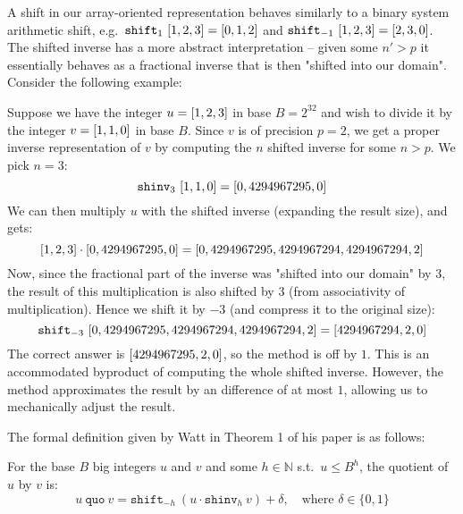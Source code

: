 A shift in our array-oriented representation behaves similarly to a binary
system arithmetic shift, e.g.\ $\mathtt{shift}_1~\mathtt{[}1,2,3\mathtt{]} = \mathtt{[}0,1,2\mathtt{]}$ and
$\mathtt{shift}_{-1}~\mathtt{[}1,2,3\mathtt{]} = \mathtt{[}2,3,0\mathtt{]}$. The shifted inverse has a more
abstract interpretation -- given some $n'>p$ it essentially behaves as a
fractional inverse that is then "shifted into our domain". Consider the
following example:

\begin{example}
Suppose we have the integer $u=\mathtt{[}1,2,3\mathtt{]}$ in base $B=2^{32}$ and wish to divide
it by the integer $v=\mathtt{[}1,1,0\mathtt{]}$ in base $B$. Since $v$ is of precision $p=2$,
we get a proper inverse representation of $v$ by computing the $n$ shifted
inverse for some $n>p$. We pick $n=3$:
\begin{equation}
\label{eq:3}
\mathtt{shinv}_3~\mathtt{[}1,1,0\mathtt{]} = \mathtt{[}0,4294967295,0\mathtt{]}
\end{equation}
We can then multiply $u$ with the shifted inverse (expanding the result size),
and gets:
\begin{equation}
  \label{eq:4}
  \mathtt{[}1,2,3\mathtt{]}\cdot\mathtt{[}0,4294967295,0\mathtt{]} = \mathtt{[}0,4294967295,4294967294,4294967294,2\mathtt{]}
\end{equation}
Now, since the fractional part of the inverse was "shifted into our domain" by
3, the result of this multiplication is also shifted by 3 (from associativity of
multiplication). Hence we shift it by $-3$ (and compress it to the original
size):
\begin{equation}
  \label{eq:5}
  \mathtt{shift}_{-3}~\mathtt{[}0,4294967295,4294967294,4294967294,2\mathtt{]} = \mathtt{[}4294967294,2,0\mathtt{]}
\end{equation}
The correct answer is $\mathtt{[}4294967295,2,0\mathtt{]}$, so the method is off by $1$. This
is an accommodated byproduct of computing the whole shifted inverse. However,
the method approximates the result by an difference of at most $1$, allowing us
to mechanically adjust the result.\newline
\end{example}

The formal definition given by Watt in Theorem 1 of his paper
\cite{watt2023efficient} is as follows:

\begin{definition}\label{def:quo}
  For the base $B$ big integers $u$ and $v$ and some $h\in \mathbb{N}$ s.t.\
  $u \leq B^h$, the quotient of $u$ by $v$ is:
  \begin{equation}
    \label{eq:defquo}
    u~\mathtt{quo}~v = \mathtt{shift}_{-h}~ (u \cdot \mathtt{shinv}_h~v) + \delta,\quad \text{where~} \delta \in \{0,1\}
  \end{equation}
\end{definition}

